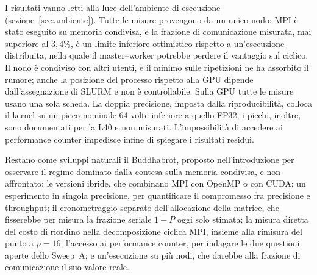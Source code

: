 I risultati vanno letti alla luce dell'ambiente di esecuzione
(sezione~\ref{sec:ambiente}). Tutte le misure provengono da un unico nodo: MPI è
stato eseguito su memoria condivisa, e la frazione di comunicazione misurata, mai
superiore al $3{,}4\%$, è un limite inferiore ottimistico rispetto a
un'esecuzione distribuita, nella quale il master--worker potrebbe perdere il
vantaggio sul ciclico. Il nodo è condiviso con altri utenti, e il minimo sulle
ripetizioni ne ha assorbito il rumore; anche la posizione del processo rispetto
alla GPU dipende dall'assegnazione di SLURM e non è controllabile. Sulla GPU tutte
le misure usano una sola scheda. La doppia precisione, imposta dalla
riproducibilità, colloca il kernel su un picco nominale $64$ volte inferiore a
quello FP32; i picchi, inoltre, sono documentati per la L40 e non misurati.
L'impossibilità di accedere ai performance counter impedisce infine di spiegare
i risultati residui.

Restano come sviluppi naturali il Buddhabrot, proposto nell'introduzione per
osservare il regime dominato dalla contesa sulla memoria condivisa, e non
affrontato; le versioni ibride, che combinano MPI con OpenMP o con CUDA; un
esperimento in singola precisione, per quantificare il compromesso fra
precisione e throughput; il cronometraggio separato dell'allocazione della
matrice, che fisserebbe per misura la frazione seriale $1-P$ oggi solo stimata;
la misura diretta del costo di riordino nella
decomposizione ciclica MPI, insieme alla rimisura del punto a $p=16$; l'accesso
ai performance counter, per indagare le due questioni aperte dello Sweep~A; e
un'esecuzione su più nodi, che darebbe alla frazione di comunicazione il suo
valore reale.
